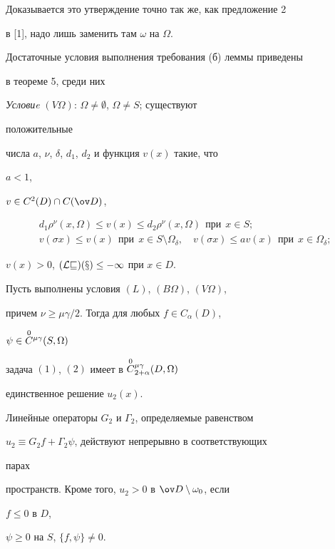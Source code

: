  


Доказывается это утверждение точно так же, как предложение 2 


в [1], надо лишь заменить там $\omega$ на $\Omega$. 


 


Достаточные условия выполнения требования (б) леммы приведены 


в теореме 5, среди них 


\medskip 


 


{\it Условиe} $(V\Omega)$: $\Omega\ne\emptyset$, $\Omega\ne S$; существуют 


положительные 


числа $a$, $\nu$, $\delta$, $d_1$, $d_2$ и функция $v(x)$ такие, что 


$a<1$, 


$v\in C^2(D)\cap C(\ov D)$, 


\begin{gather} 


d_1\rho^\nu(x,\Omega)\le v(x)\le d_2\rho^\nu(x,\Omega) 


\ \ \text{при}\ \ x\in S; \\ 


% 


v(\sigma x)\le v(x)\ \ 


\text{при}\ \ x\in S\setminus\Omega_\delta,\quad 


v(\sigma x)\le a v(x)\ \ 


\text{при}\ \ x\in\Omega_\delta; 


\end{gather} 


$v(x)>0$, $(\cal L v)(x)\le-1$ при $x\in D$. 


 


\begin{thm} 


Пусть выполнены условия $(L)$, $(B\Omega)$, $(V\Omega)$, 


причем $\nu\ge\mu\gamma/2$. Тогда для любых $f\in C_\alpha(D)$, 


$\psi\in\overset{0}{C}{}^{\mu\gamma}(S,\Omega)$ 


задача $(1)$, $(2)$ имеет в $\overset{0}{C}{}^{\mu\gamma}_{2+\alpha}(D,\Omega)$ 


единственное решение $u_2(x)$. 


Линейные операторы $G_2$ и $\Gamma_2$, определяемые равенством 


$u_2\equiv G_2f+\Gamma_2\psi$, действуют непрерывно в соответствующих 


парах 


пространств. Кроме того, $u_2>0$ в $\ov D\setminus\omega_0$, если 


$f\le0$ в $D$, 


$\psi\ge0$ на $S$, $\{f,\psi\}\ne0$. 


\end{thm} 


